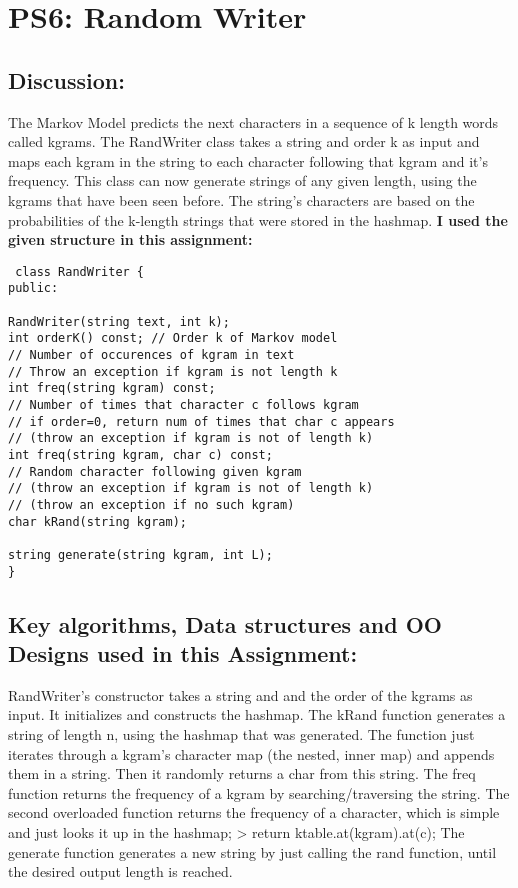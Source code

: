 \section{PS6: Random Writer}\label{sec:ps6}
\graphicspath{{ps6}}
\subsection{Discussion:}\label{sec:ps6:disc}
 The Markov Model predicts the next characters in a sequence of k length words called kgrams.
 The RandWriter class takes a string and order k as input and maps each kgram in the string to each
 character following that kgram and it's frequency.
 This class can now generate strings of any given length, using the kgrams that have been seen before.
 The string's characters are based on the probabilities of the k-length strings that were stored in the hashmap.
 \newline
 \textbf{I used the given structure in this assignment:}
 \begin{lstlisting}
 class RandWriter {
public:

RandWriter(string text, int k);
int orderK() const; // Order k of Markov model
// Number of occurences of kgram in text
// Throw an exception if kgram is not length k
int freq(string kgram) const;
// Number of times that character c follows kgram
// if order=0, return num of times that char c appears
// (throw an exception if kgram is not of length k)
int freq(string kgram, char c) const;
// Random character following given kgram
// (throw an exception if kgram is not of length k)
// (throw an exception if no such kgram)
char kRand(string kgram);

string generate(string kgram, int L);
}

 \end{lstlisting}

\subsection{Key algorithms, Data structures and OO Designs used in this Assignment:}
RandWriter's constructor takes a string and and the order of the kgrams as input.
It initializes and constructs the hashmap.
The kRand function generates a string of length n, using the hashmap that was generated.
The function just iterates through a kgram's character map (the nested, inner map) and appends them in a string.
Then it randomly returns a char from this string.
The freq function returns the frequency of a kgram by searching/traversing the string.
The second overloaded function returns the frequency of a character, which is simple and just looks it up in the hashmap;
> return ktable.at(kgram).at(c);
The generate function generates a new string by just calling the rand function, until the desired output length is reached.


